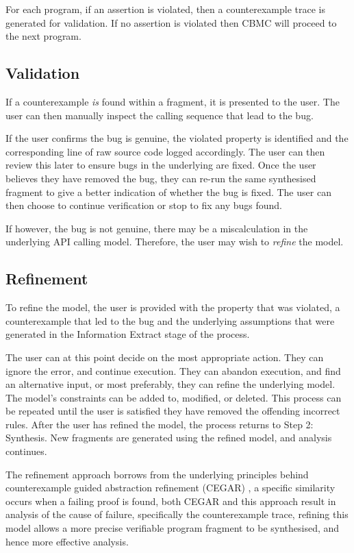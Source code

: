 \documentclass[EPiCempty]{easychair}
\begin{document}
For each program, if an assertion is violated, then a counterexample trace is generated for validation.  If no assertion is violated then CBMC will proceed to the next program.

\subsection{Validation}
\label{sec:validation}
If a counterexample \emph{is} found within a fragment, it is presented to the user.   The user can then manually inspect the calling sequence that lead to the bug.  

If the user confirms the bug is genuine, the violated property is identified and the corresponding line of raw source code logged accordingly.  The user can then review this later to ensure bugs in the underlying are fixed.  Once the user believes they have removed the bug, they can re-run the same synthesised fragment to give a better indication of whether the bug is fixed.  The user can then choose to continue verification or stop to fix any bugs found.

If however, the bug is not genuine, there may be a miscalculation in the underlying API calling model.  Therefore, the user may wish to \emph{refine} the model.


\subsection{Refinement}
\label{sec:refinement}
To refine the model, the user is provided with the property that was violated, a counterexample that led to the bug and the underlying assumptions that were generated in the Information Extract stage of the process.

The user can at this point decide on the most appropriate action.  They can ignore the error, and continue execution.  They can abandon execution, and find an alternative input, or most preferably, they can refine the underlying model.  The model's constraints can be added to, modified, or deleted.  This process can be repeated until the user is satisfied they have removed the offending incorrect rules.  After the user has refined the model,  the process returns to Step 2:  Synthesis.  New fragments are generated using the refined model, and analysis continues.

The refinement approach borrows from the underlying principles behind counterexample guided abstraction refinement (CEGAR) \cite{Clarke2000}, a specific similarity occurs when a failing proof is found, both CEGAR and this approach result in analysis of the cause of failure, specifically the counterexample trace, refining this model allows a more precise verifiable program fragment to be synthesised, and hence more effective analysis.
\end{document}
